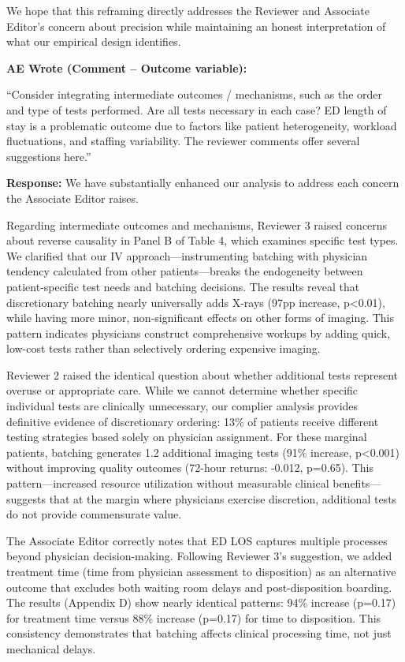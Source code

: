 \documentclass[11pt]{article}
\newenvironment{quote2}
{ \bigskip
\noindent
         \small\em
         \baselineskip=14pt
}
\newcommand{\1}{\hbox{\rm 1\kern-.35em 1}}
\begin{document}
We hope that this reframing directly addresses the Reviewer and Associate Editor's concern about precision while maintaining an honest interpretation of what our empirical design identifies.

\begin{quote2}
\textbf{AE Wrote (Comment – Outcome variable):} 

\noindent``Consider integrating intermediate outcomes / mechanisms, such as the order and type of tests performed. Are all tests necessary in each case? ED length of stay is a problematic outcome due to factors like patient heterogeneity, workload fluctuations, and staffing variability. The reviewer comments offer several suggestions here.” 

\end{quote2}

\noindent\textbf{Response:} \color{blue}We have substantially enhanced our analysis to address each concern the Associate Editor raises.

Regarding intermediate outcomes and mechanisms, Reviewer 3 raised concerns about reverse causality in Panel B of Table 4, which examines specific test types. We clarified that our IV approach—instrumenting batching with physician tendency calculated from other patients—breaks the endogeneity between patient-specific test needs and batching decisions. The results reveal that discretionary batching nearly universally adds X-rays (97pp increase, p<0.01), while having more minor, non-significant effects on other forms of imaging. This pattern indicates physicians construct comprehensive workups by adding quick, low-cost tests rather than selectively ordering expensive imaging.

Reviewer 2 raised the identical question about whether additional tests represent overuse or appropriate care. While we cannot determine whether specific individual tests are clinically unnecessary, our complier analysis provides definitive evidence of discretionary ordering: 13\% of patients receive different testing strategies based solely on physician assignment. For these marginal patients, batching generates 1.2 additional imaging tests (91\% increase, p<0.001) without improving quality outcomes (72-hour returns: -0.012, p=0.65). This pattern—increased resource utilization without measurable clinical benefits—suggests that at the margin where physicians exercise discretion, additional tests do not provide commensurate value.

The Associate Editor correctly notes that ED LOS captures multiple processes beyond physician decision-making. Following Reviewer 3's suggestion, we added treatment time (time from physician assessment to disposition) as an alternative outcome that excludes both waiting room delays and post-disposition boarding. The results (Appendix D) show nearly identical patterns: 94\% increase (p=0.17) for treatment time versus 88\% increase (p=0.17) for time to disposition. This consistency demonstrates that batching affects clinical processing time, not just mechanical delays.
\end{document}
